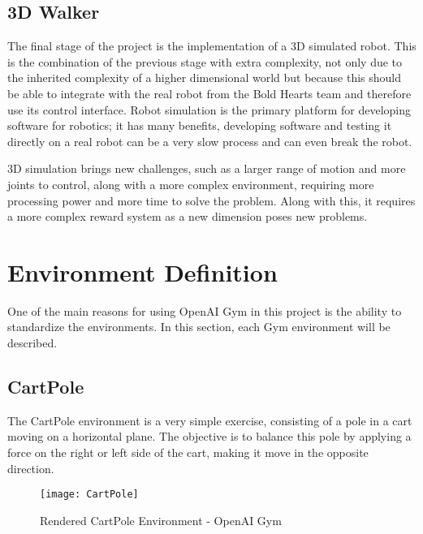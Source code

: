 \subsection{3D Walker}
The final stage of the project is the implementation of a 3D simulated robot. This is the combination of the previous stage with extra complexity, not only due to the inherited complexity of a higher dimensional world but because this should be able to integrate with the real robot from the Bold Hearts team and therefore use its control interface.
Robot simulation is the primary platform for developing software for robotics; it has many benefits, developing software and testing it directly on a real robot can be a very slow process and can even break the robot.

3D simulation brings new challenges, such as a larger range of motion and more joints to control, along with a more complex environment, requiring more processing power and more time to solve the problem. 
Along with this, it requires a more complex reward system as a new dimension poses new problems.

\section{Environment Definition}
One of the main reasons for using OpenAI Gym in this project is the ability to standardize the environments.
In this section, each Gym environment will be described.

\subsection{CartPole}
The CartPole environment is a very simple exercise, consisting of a pole in a cart moving on a horizontal plane. The objective is to balance this pole by applying a force on the right or left side of the cart, making it move in the opposite direction.
\cite{cartpole}

\begin{figure}[H]
 \centering
 \texttt{[image: CartPole]}
 \caption{Rendered CartPole Environment - OpenAI Gym}
\end{figure}

